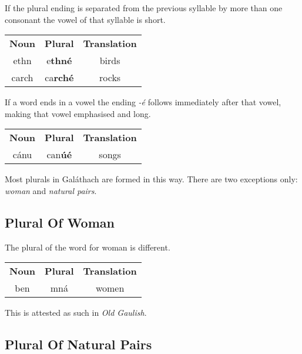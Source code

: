 If the plural ending is separated from the previous syllable by more than one consonant the vowel of that syllable is short.
\begin{table}[H]
\centering
\begin{tabular}{ccc}
  \toprule
  \textbf{Noun} & \textbf{Plural} & \textbf{Translation}\\
  \cmidrule(lr){1-1}\cmidrule(lr){2-2}\cmidrule(lr){3-3}
  ethn & e\textbf{thn\'{e}} & birds\\
  carch & ca\textbf{rch\'{e}} & rocks\\
  \bottomrule
\end{tabular}
\label{example_plural_multiple_consonants}
\end{table}

If a word ends in a vowel the ending \textit{-\'{e}} follows immediately after that vowel, making that vowel emphasised and long.
\begin{table}[H]
\centering
\begin{tabular}{ccc}
  \toprule
  \textbf{Noun} & \textbf{Plural} & \textbf{Translation}\\
  \cmidrule(lr){1-1}\cmidrule(lr){2-2}\cmidrule(lr){3-3}
  c\'{a}nu & can\textbf{\'{u}\'{e}} & songs\\
  \bottomrule
\end{tabular}
\label{example_plural_ends_in_vowel}
\end{table}

Most plurals in Gal\'{a}thach are formed in this way. There are two exceptions only: \textit{woman} and \textit{natural pairs}.

\subsection{Plural Of Woman}

The plural of the word for woman is different.
\begin{table}[H]
\centering
\begin{tabular}{ccc}
  \toprule
  \textbf{Noun} & \textbf{Plural} & \textbf{Translation}\\
  \cmidrule(lr){1-1}\cmidrule(lr){2-2}\cmidrule(lr){3-3}
  ben & mn\'{a} & women\\
  \bottomrule
\end{tabular}
\label{example_plural_of_woman}
\end{table}

This is attested as such in \textit{Old Gaulish}.

\subsection{Plural Of Natural Pairs}

